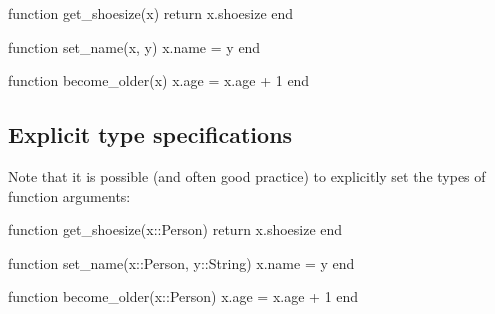 \documentclass[
  letterpaper,
  DIV=11,
  numbers=noendperiod]{scrartcl}
\newenvironment{Shaded}{\begin{snugshade}}{\end{snugshade}}
\newcommand{\ControlFlowTok}[1]{\textcolor[rgb]{0.00,0.23,0.31}{#1}}
\newcommand{\DataTypeTok}[1]{\textcolor[rgb]{0.68,0.00,0.00}{#1}}
\newcommand{\FloatTok}[1]{\textcolor[rgb]{0.68,0.00,0.00}{#1}}
\newcommand{\FunctionTok}[1]{\textcolor[rgb]{0.28,0.35,0.67}{#1}}
\newcommand{\KeywordTok}[1]{\textcolor[rgb]{0.00,0.23,0.31}{#1}}
\newcommand{\NormalTok}[1]{\textcolor[rgb]{0.00,0.23,0.31}{#1}}
\newcommand{\OperatorTok}[1]{\textcolor[rgb]{0.37,0.37,0.37}{#1}}
\begin{document}
\begin{tcolorbox}[enhanced jigsaw, left=2mm, colbacktitle=quarto-callout-tip-color!10!white, titlerule=0mm, breakable, arc=.35mm, opacitybacktitle=0.6, coltitle=black, opacityback=0, toprule=.15mm, bottomrule=.15mm, colframe=quarto-callout-tip-color-frame, bottomtitle=1mm, rightrule=.15mm, leftrule=.75mm, colback=white, toptitle=1mm, title=\textcolor{quarto-callout-tip-color}{\faLightbulb}\hspace{0.5em}{Answer}]

\begin{Shaded}
\begin{Highlighting}[]
\KeywordTok{function} \FunctionTok{get\_shoesize}\NormalTok{(x)}
  \ControlFlowTok{return}\NormalTok{ x.shoesize}
\KeywordTok{end}

\KeywordTok{function} \FunctionTok{set\_name}\NormalTok{(x, y)}
\NormalTok{  x.name }\OperatorTok{=}\NormalTok{ y}
\KeywordTok{end}

\KeywordTok{function} \FunctionTok{become\_older}\NormalTok{(x)}
\NormalTok{  x.age }\OperatorTok{=}\NormalTok{ x.age }\OperatorTok{+} \FloatTok{1}
\KeywordTok{end}
\end{Highlighting}
\end{Shaded}

\end{tcolorbox}

\subsection{Explicit type
specifications}\label{explicit-type-specifications}

Note that it is possible (and often good practice) to explicitly set the
types of function arguments:

\begin{Shaded}
\begin{Highlighting}[]
\KeywordTok{function} \FunctionTok{get\_shoesize}\NormalTok{(x}\OperatorTok{::}\DataTypeTok{Person}\NormalTok{)}
  \ControlFlowTok{return}\NormalTok{ x.shoesize}
\KeywordTok{end}

\KeywordTok{function} \FunctionTok{set\_name}\NormalTok{(x}\OperatorTok{::}\DataTypeTok{Person}\NormalTok{, y}\OperatorTok{::}\DataTypeTok{String}\NormalTok{)}
\NormalTok{  x.name }\OperatorTok{=}\NormalTok{ y}
\KeywordTok{end}

\KeywordTok{function} \FunctionTok{become\_older}\NormalTok{(x}\OperatorTok{::}\DataTypeTok{Person}\NormalTok{)}
\NormalTok{  x.age }\OperatorTok{=}\NormalTok{ x.age }\OperatorTok{+} \FloatTok{1}
\KeywordTok{end}
\end{Highlighting}
\end{Shaded}
\end{document}
